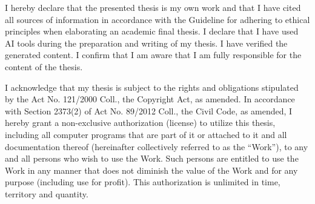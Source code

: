 \documentclass[english,bachelor,unicode,oneside,bw]{ctufit-thesis}
\begin{document}
\begin{declarationpage}
	I hereby declare that the presented thesis is my own work and that I have cited all sources of
	information in accordance with the Guideline for adhering to ethical principles when elaborating an
	academic final thesis.
	I declare that I have used AI tools during the preparation and writing of my thesis. I have verified
	the generated content. I confirm that I am aware that I am fully responsible for the content of the
	thesis.

	I acknowledge that my thesis is subject to the rights and obligations stipulated by the Act No.
	121/2000 Coll., the Copyright Act, as amended. In accordance with Section 2373(2) of Act No.
	89/2012 Coll., the Civil Code, as amended, I hereby grant a non-exclusive authorization (license) to
	utilize this thesis, including all computer programs that are part of it or attached to it and all
	documentation thereof (hereinafter collectively referred to as the ``Work''), to any and all persons
	who wish to use the Work. Such persons are entitled to use the Work in any manner that does not
	diminish the value of the Work and for any purpose (including use for profit). This authorization is
	unlimited in time, territory and quantity.
\end{declarationpage}

\printabstractpage{} %

% 
% 
% 
% 
% 
% 
% 
% 
% 
\end{document}
